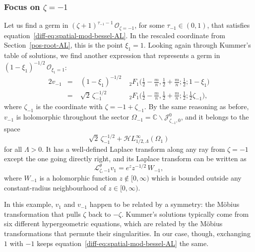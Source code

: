 \documentclass{article}
\newcommand{\singexp}[2]{\mathcal{H}L^\infty_{#1, #2}}
\newcommand{\C}{\mathbb{C}}
\newcommand{\laplace}{\mathcal{L}}
\theoremstyle{definition}
\theoremstyle{plain}
\begin{document}
\subsubsection{Focus on $\zeta = -1$}\label{neg-root-AL}
%
Let us find a germ in $(\zeta+1)^{\tau_{-1}-1}\,\mathcal{O}_{\zeta=-1}$, for some $\tau_{-1} \in (0, 1)$, that satisfies equation~\eqref{diff-eq:spatial-mod-bessel-AL}. In the rescaled coordinate from Section~\ref{pos-root-AL}, this is the point $\xi_1 = 1$. Looking again through Kummer's table of solutions, we find another expression \cite[formula~15.10.14]{dlmf} that represents a germ in $(1-\xi_1)^{-1/2}\,\mathcal{O}_{\xi_1=1}$:
\begin{alignat*}{2}
v_{-1} &=\;& (1-\xi_1)^{-1/2} &\;{}_2F_1\big(\tfrac{1}{2}-\tfrac{m}{n}, \tfrac{1}{2}+\tfrac{m}{n}; \tfrac{1}{2}; 1-\xi_1\big) \\[1mm]
&=\;& \sqrt{2}\,\zeta_{-1}^{-1/2} &\;{}_2F_1\big(\tfrac{1}{2}-\tfrac{m}{n}, \tfrac{1}{2}+\tfrac{m}{n}; \tfrac{1}{2}; \tfrac{1}{2}\zeta_{-1}\big),
\end{alignat*}
where $\zeta_{-1}$ is the coordinate with $\zeta = -1 + \zeta_{-1}$. By the same reasoning as before, $v_{-1}$ is holomorphic throughout the sector $\Omega_{-1} = \C \smallsetminus \mathcal{J}^0_{\zeta_{-1}, 0}$, and it belongs to the space
\[ \sqrt{2}\,\zeta_{-1}^{-1/2} + \singexp{1/2}{\Lambda}(\Omega_1) \]
for all $\Lambda > 0$. It has a well-defined Laplace transform along any ray from $\zeta = -1$ except the one going directly right, and its Laplace transform can be written as
\[ \laplace^\theta_{\zeta, -1} v_1 = e^z z^{-1/2}\,W_{-1}, \]
where $W_{-1}$ is a holomorphic function $z \notin [0, \infty)$ which is bounded outside any constant-radius neighbourhood of $z \in [0, \infty)$.


In this example, $v_1$ and $v_{-1}$ happen to be related by a symmetry: the M\"{o}bius transformation that pulls $\zeta$ back to $-\zeta$. Kummer's solutions typically come from six different hypergeometric equations, which are related by the M\"{o}bius transformations that permute their singularities. In our case, though, exchanging $1$ with $-1$ keeps equation~\eqref{diff-eq:spatial-mod-bessel-AL} the same.
\end{document}
